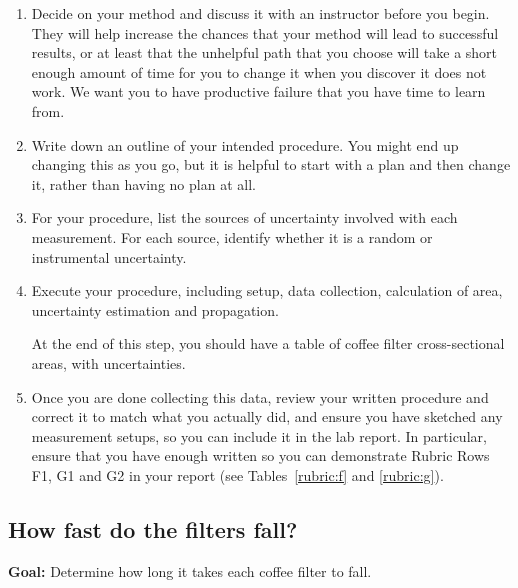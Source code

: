 \begin{enumerate}
	
	
	\item Decide on your method and discuss it with an instructor before you begin. They will help increase the chances that your method will lead to successful results, or at least that the unhelpful path that you choose will take a short enough amount of time for you to change it when you discover it does not work. We want you to have productive failure that you have time to learn from.
	
	\item Write down an outline of your intended procedure. You might end up changing this as you go, but it is helpful to start with a plan and then change it, rather than having no plan at all.
	
	\item For your procedure, list the sources of uncertainty involved with each measurement. For each source, identify whether it is a random or instrumental uncertainty.
	
	\item Execute your procedure, including setup, data collection, calculation of area, uncertainty estimation and propagation.
	
	\begin{framed}
	At the end of this step, you should have a table of coffee filter cross-sectional areas, with uncertainties.
	\end{framed}
	
	\item Once you are done collecting this data, review your written procedure and correct it to match what you actually did, and ensure you have sketched any measurement setups, so you can include it in the lab report. In particular, ensure that you have enough written so you can demonstrate Rubric Rows F1, G1 and G2 in your report (see Tables~\ref{rubric:f} and \ref{rubric:g}).
	
\end{enumerate}
 
\subsection{How fast do the filters fall?}

\textbf{Goal:} Determine how long it takes each coffee filter to fall.


